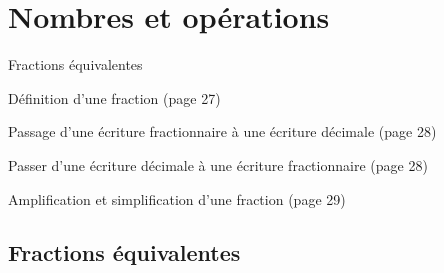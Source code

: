 \documentclass[a4paper,12pt]{report}
\begin{document}
\newcommand{\chapterName}{Nombres et opérations}
\newcommand{\serieName}{Fractions équivalentes}


\chapter*{\chapterName}
\thispagestyle{empty}

\begin{amL}{\serieName}{
\item Définition d'une fraction (page 27)
\item Passage d'une écriture fractionnaire à une écriture décimale (page 28)
\item Passer d'une écriture décimale à une écriture fractionnaire (page 28)
	\item Amplification et simplification d'une fraction (page 29)
}
\end{amL}
\section*{\serieName}
\setcounter{page}{1}
\thispagestyle{firstPage}



\end{document}
